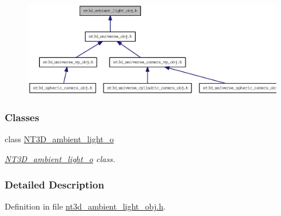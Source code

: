 \begin{figure}[H]
\begin{center}
\leavevmode
\includegraphics[width=400pt]{nt3d__ambient__light__obj_8h__dep__incl}
\end{center}
\end{figure}
\subsubsection*{Classes}
\begin{DoxyCompactItemize}
\item 
class \hyperlink{class_n_t3_d__ambient__light__o}{NT3D\_\-ambient\_\-light\_\-o}
\begin{DoxyCompactList}\small\item\em \hyperlink{class_n_t3_d__ambient__light__o}{NT3D\_\-ambient\_\-light\_\-o} class. \item\end{DoxyCompactList}\end{DoxyCompactItemize}


\subsubsection{Detailed Description}


Definition in file \hyperlink{nt3d__ambient__light__obj_8h_source}{nt3d\_\-ambient\_\-light\_\-obj.h}.

